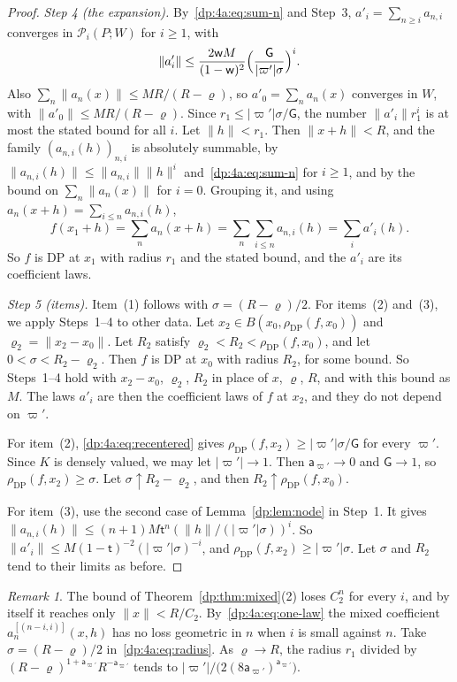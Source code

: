 \documentclass[11pt]{amsart}
\theoremstyle{definition}
\theoremstyle{remark}
\newtheorem{remark}[theorem]{Remark}
\numberwithin{equation}{section}
\newcommand{\abs}[1]{\lvert #1\rvert}
\newcommand{\norm}[1]{\lVert #1\rVert}
\theoremstyle{plain}
\theoremstyle{definition}
\theoremstyle{plain}
\newcommand{\cP}{\mathcal P}
\begin{document}
\begin{proof}
\emph{Step 4 (the expansion).} By~\eqref{dp:4a:eq:sum-n} and Step~3, $a'_i=\sum_{n\ge i}a_{n,i}$ converges in $\cP_i(P;W)$ for $i\ge1$, with
\begin{equation}\label{dp:4a:eq:recentered}
 \norm{a'_i}\le\frac{2\mathsf wM}{(1-\mathsf w)^2}\Bigl(\frac{\mathsf G}{\abs{\varpi'}\sigma}\Bigr)^i.
\end{equation}
Also $\sum_n\norm{a_n(x)}\le MR/(R-\varrho)$, so $a'_0=\sum_na_n(x)$ converges in $W$, with $\norm{a'_0}\le MR/(R-\varrho)$. Since $r_1\le\abs{\varpi'}\sigma/\mathsf G$, the number $\norm{a'_i}r_1^i$ is at most the stated bound for all $i$. Let $\norm h<r_1$. Then $\norm{x+h}<R$, and the family $(a_{n,i}(h))_{n,i}$ is absolutely summable, by $\norm{a_{n,i}(h)}\le\norm{a_{n,i}}\norm h^i$ and~\eqref{dp:4a:eq:sum-n} for $i\ge1$, and by the bound on $\sum_n\norm{a_n(x)}$ for $i=0$. Grouping it, and using $a_n(x+h)=\sum_{i\le n}a_{n,i}(h)$,
\[
 f(x_1+h)=\sum_na_n(x+h)=\sum_n\sum_{i\le n}a_{n,i}(h)=\sum_ia'_i(h).
\]
So $f$ is DP at $x_1$ with radius $r_1$ and the stated bound, and the $a'_i$ are its coefficient laws.

\emph{Step 5 (items).} Item~(1) follows with $\sigma=(R-\varrho)/2$. For items~(2) and~(3), we apply Steps~1--4 to other data. Let $x_2\in B(x_0,\rho_{\mathrm{DP}}(f,x_0))$ and $\varrho_2=\norm{x_2-x_0}$. Let $R_2$ satisfy $\varrho_2<R_2<\rho_{\mathrm{DP}}(f,x_0)$, and let $0<\sigma<R_2-\varrho_2$. Then $f$ is DP at $x_0$ with radius $R_2$, for some bound. So Steps~1--4 hold with $x_2-x_0$, $\varrho_2$, $R_2$ in place of $x$, $\varrho$, $R$, and with this bound as $M$. The laws $a'_i$ are then the coefficient laws of $f$ at $x_2$, and they do not depend on $\varpi'$.

For item~(2), \eqref{dp:4a:eq:recentered} gives $\rho_{\mathrm{DP}}(f,x_2)\ge\abs{\varpi'}\sigma/\mathsf G$ for every $\varpi'$. Since $K$ is densely valued, we may let $\abs{\varpi'}\to1$. Then $\mathsf a_{\varpi'}\to0$ and $\mathsf G\to1$, so $\rho_{\mathrm{DP}}(f,x_2)\ge\sigma$. Let $\sigma\uparrow R_2-\varrho_2$, and then $R_2\uparrow\rho_{\mathrm{DP}}(f,x_0)$.

For item~(3), use the second case of Lemma~\ref{dp:lem:node} in Step~1. It gives $\norm{a_{n,i}(h)}\le(n+1)M\mathsf t^n(\norm h/(\abs{\varpi'}\sigma))^i$. So $\norm{a'_i}\le M(1-\mathsf t)^{-2}(\abs{\varpi'}\sigma)^{-i}$, and $\rho_{\mathrm{DP}}(f,x_2)\ge\abs{\varpi'}\sigma$. Let $\sigma$ and $R_2$ tend to their limits as before.
\end{proof}

\begin{remark}\label{dp:rem:whole-ball}
The bound of Theorem~\ref{dp:thm:mixed}(2) loses $C_2^n$ for every $i$, and by itself it reaches only $\norm x<R/C_2$. By~\eqref{dp:4a:eq:one-law} the mixed coefficient $a_n^{[(n-i,i)]}(x,h)$ has no loss geometric in $n$ when $i$ is small against $n$. Take $\sigma=(R-\varrho)/2$ in~\eqref{dp:4a:eq:radius}. As $\varrho\to R$, the radius $r_1$ divided by $(R-\varrho)^{1+\mathsf a_{\varpi'}}R^{-\mathsf a_{\varpi'}}$ tends to $\abs{\varpi'}/\bigl(2(8\mathsf a_{\varpi'})^{\mathsf a_{\varpi'}}\bigr)$.
\end{remark}
\end{document}
